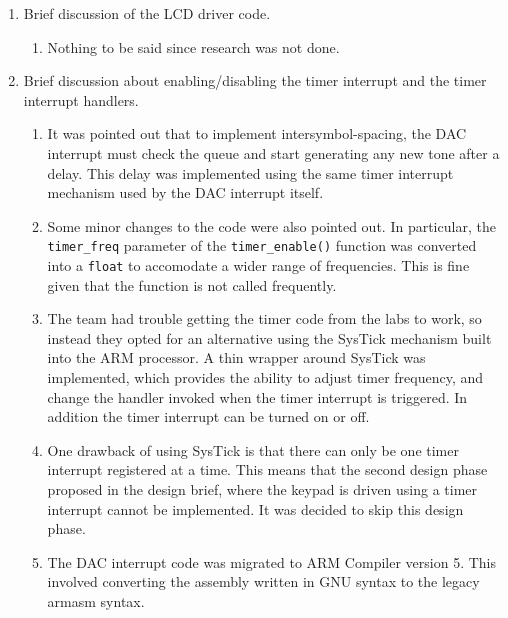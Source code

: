 \documentclass[11pt,a4paper]{scrartcl}
\begin{document}
\begin{enumerate}
   \item Brief discussion of the LCD driver code.
      \begin{enumerate}
         \item Nothing to be said since research was not done.
      \end{enumerate}
   
   \item Brief discussion about enabling/disabling the timer interrupt and the timer interrupt handlers.
      \begin{enumerate}
         \item It was pointed out that to implement intersymbol-spacing, the DAC interrupt must check the queue and start generating any new tone after a delay. This delay was implemented using the same timer interrupt mechanism used by the DAC interrupt itself.
         \item Some minor changes to the code were also pointed out. In particular, the \verb!timer_freq! parameter of the \verb!timer_enable()! function was converted into a \Verb!float! to accomodate a wider range of frequencies. This is fine given that the function is not called frequently.
         \item The team had trouble getting the timer code from the labs to work, so instead they opted for an alternative using the SysTick mechanism built into the ARM processor. A thin wrapper around SysTick was implemented, which provides the ability to adjust timer frequency, and change the handler invoked when the timer interrupt is triggered. In addition the timer interrupt can be turned on or off.
         \item One drawback of using SysTick is that there can only be one timer interrupt registered at a time. This means that the second design phase proposed in the design brief, where the keypad is driven using a timer interrupt cannot be implemented. It was decided to skip this design phase.
         \item The DAC interrupt code was migrated to ARM Compiler version 5. This involved converting the assembly written in GNU syntax to the legacy armasm syntax.
      \end{enumerate}
   

\end{enumerate}
\end{document}
